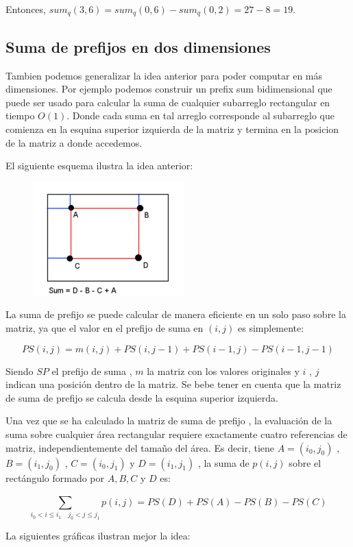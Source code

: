 Entonces, $sum_{q}(3,6) = sum_{q}(0,6)-sum_{q}(0,2)=27-8=19$.

\subsection{Suma de prefijos en dos dimensiones}

Tambien podemos generalizar la idea anterior para poder computar en más dimensiones. Por ejemplo podemos construir un prefix sum bidimensional que puede ser usado para calcular la suma de cualquier subarreglo rectangular en tiempo $O(1)$. Donde cada suma en tal arreglo corresponde al subarreglo que comienza en la esquina superior izquierda de la matriz y termina en la posicion de la matriz a donde accedemos.

El siguiente esquema ilustra la idea anterior:

\begin{figure}[h!]
	\centering
	\includegraphics[width=0.2\linewidth]{img/prefix_sum_2D}
	\label{fig:prefixsum2d}
\end{figure}

La suma de prefijo se puede calcular de manera eficiente en un solo paso sobre la matriz, ya que el valor en el prefijo de suma en $(i,j)$ es simplemente: 

$$PS(i,j) = m(i,j) + PS(i,j-1) + PS(i-1,j) - PS(i-1,j-1)$$

Siendo $SP$ el prefijo de suma , $m$ la matriz con los valores originales y $i$ , $j$ indican una posición dentro de la matriz. Se bebe tener en cuenta que la matriz de suma de prefijo se calcula desde la esquina superior izquierda.

Una vez que se ha calculado la matriz de suma de prefijo , la evaluación de la suma sobre cualquier área rectangular requiere exactamente cuatro referencias de matriz, independientemente del tamaño del área. Es decir, tiene $A = (i_0 , j_0)$ , $B = ( i_1 , j_0 )$ , $C = ( i_0 , j_1 )$ y $D = ( i_1 , j_1 )$ , la suma de $p(i,j)$ sobre el rectángulo formado por $A , B , C$ y $D$ es:

$$ \sum_{ i_0 < i \le i_1 \quad j_0 < j \le j_1}^{} p(i,j) = PS(D)+PS(A)-PS(B)-PS(C) $$

La siguientes gráficas ilustran mejor la idea:

